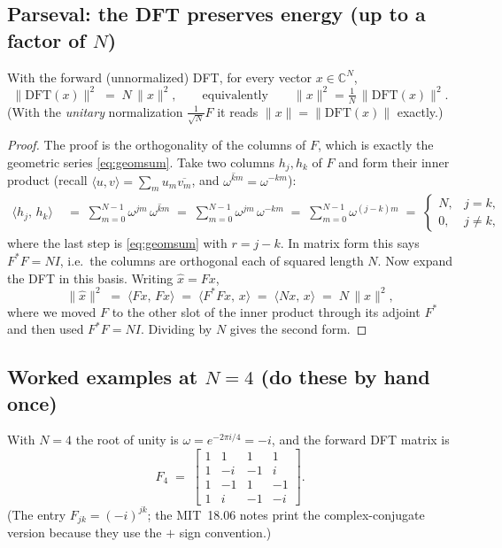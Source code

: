 \subsection{Parseval: the DFT preserves energy (up to a factor of $N$)}

\begin{theorem}
\label{thm:parseval}
With the forward (unnormalized) DFT, for every vector $x \in \mathbb{C}^N$,
\[
  \|\mathrm{DFT}(x)\|^2 \;=\; N\,\|x\|^2,
  \qquad\text{equivalently}\qquad \|x\|^2 = \tfrac1N\,\|\mathrm{DFT}(x)\|^2 .
\]
(With the \emph{unitary} normalization $\tfrac{1}{\sqrt N}F$ it reads $\|x\| =
\|\mathrm{DFT}(x)\|$ exactly.)
\end{theorem}

\begin{proof}
The proof is the orthogonality of the columns of $F$, which is exactly the geometric
series \eqref{eq:geomsum}. Take two columns $h_j, h_k$ of $F$ and form their inner
product (recall $\langle u,v\rangle = \sum_m u_m \overline{v_m}$, and
$\overline{\omega^{km}} = \omega^{-km}$):
\begin{align*}
  \langle h_j,\, h_k\rangle
    \;&=\; \sum_{m=0}^{N-1} \omega^{jm}\,\overline{\omega^{km}}
        \;=\; \sum_{m=0}^{N-1} \omega^{jm}\,\omega^{-km}
        \;=\; \sum_{m=0}^{N-1} \omega^{(j-k)m}
        \;=\;
        \begin{cases} N, & j = k, \\ 0, & j \neq k, \end{cases}
\end{align*}
where the last step is \eqref{eq:geomsum} with $r = j-k$. In matrix form this says
$F^\ast F = N I$, i.e.\ the columns are orthogonal each of squared length $N$. Now
expand the DFT in this basis. Writing $\widehat x = Fx$,
\[
  \|\widehat x\|^2
    \;=\; \langle Fx,\, Fx\rangle
    \;=\; \langle F^\ast F x,\, x\rangle
    \;=\; \langle N x,\, x\rangle
    \;=\; N\,\|x\|^2 ,
\]
where we moved $F$ to the other slot of the inner product through its adjoint $F^\ast$
and then used $F^\ast F = N I$. Dividing by $N$ gives the second form.
\end{proof}

\subsection{Worked examples at {\boldmath$N=4$} (do these by hand once)}

With $N = 4$ the root of unity is $\omega = e^{-2\pi i/4} = -i$, and the forward DFT
matrix is
\[
  F_4 \;=\;
  \begin{bmatrix}
    1 & 1 & 1 & 1 \\
    1 & -i & -1 & i \\
    1 & -1 & 1 & -1 \\
    1 & i & -1 & -i
  \end{bmatrix}.
\]
(The entry $F_{jk} = (-i)^{jk}$; the MIT~18.06 notes \citep{fourier_mit1806} print the
complex-conjugate version because they use the $+$ sign convention.)

